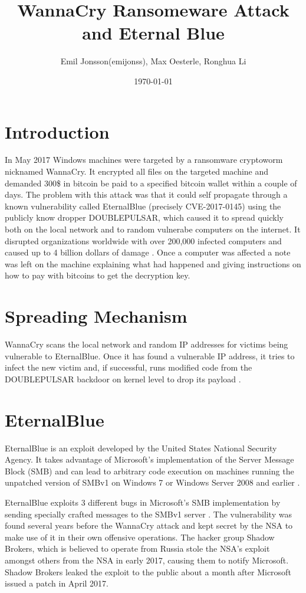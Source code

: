 \documentclass[a4paper]{article}
\title{WannaCry Ransomeware Attack and Eternal Blue}
\author{Emil Jonsson(emijonss), Max Oesterle, Ronghua Li}
\date{\today}
\begin{document}
\maketitle

\section{Introduction}
In May 2017 Windows machines were targeted by a ransomware cryptoworm nicknamed WannaCry. It encrypted all files on the targeted machine and demanded 300\$ in bitcoin be paid to a specified bitcoin wallet within a couple of days. The problem with this attack was that it could self propagate through a known vulnerability called EternalBlue (precisely CVE-2017-0145) using the publicly know dropper DOUBLEPULSAR, which caused it to spread quickly both on the local network and to random vulnerabe computers on the internet. It disrupted organizations worldwide with over 200,000 infected computers and caused up to 4 billion dollars of damage \cite{cbsnews}. Once a computer was affected a note was left on the machine explaining what had happened and giving instructions on how to pay with bitcoins to get the decryption key.

\section{Spreading Mechanism}
WannaCry scans the local network and random IP addresses for victims being vulnerable to EternalBlue. Once it has found a vulnerable IP address, it tries to infect the new victim and, if successful, runs modified code from the DOUBLEPULSAR backdoor on kernel level to drop its payload \cite{mssecurity}.

\section{EternalBlue}
EternalBlue is an exploit developed by the United States National Security Agency. It takes advantage of Microsoft's implementation of the Server Message Block (SMB) and can lead to arbitrary code execution on machines running the unpatched version of SMBv1 on Windows 7 or Windows Server 2008 and earlier \cite{checkpoint}.

EternalBlue exploits 3 different bugs in Microsoft's SMB implementation by sending specially crafted messages to the SMBv1 server \cite{checkpoint}. The vulnerability was found several years before the WannaCry attack and kept secret by the NSA to make use of it in their own offensive operations. The hacker group Shadow Brokers, which is believed to operate from Russia \cite{defcon} stole the NSA's exploit amongst others from the NSA in early 2017, causing them to notify Microsoft. Shadow Brokers leaked the exploit to the public about a month after Microsoft issued a patch in April 2017. 
\end{document}
